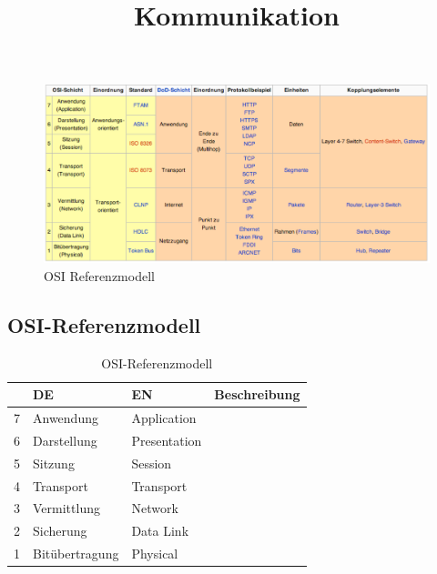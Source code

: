\documentclass[]{scrartcl}
\begin{document}
\title{Kommunikation}
\author{}


\maketitle
\tableofcontents




\begin{figure}[htb]
\begin{center}
\includegraphics[scale=0.6]{figures/osi.pdf}
\caption{OSI Referenzmodell}
\label{osi}
\end{center}
\end{figure}

\subsection{OSI-Referenzmodell}

\begin{table}[H]
\begin{center}
\begin{tabular}{llll}
 & DE & EN & Beschreibung \\
\toprule
7 & Anwendung & Application & \\
\midrule
6 & Darstellung & Presentation & \\
\midrule
5 & Sitzung & Session & \\
\midrule
4 & Transport & Transport & \\
\midrule
3 & Vermittlung & Network & \\
\midrule
2 & Sicherung & Data Link & \\
\midrule
1& Bit\"ubertragung & Physical &  \\
\bottomrule
\end{tabular}
\caption{OSI-Referenzmodell}

\end{center}
\label{default}
\end{table}%
\end{document}
